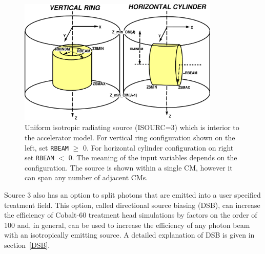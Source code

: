 \documentclass[12pt,twoside]{article}
\begin{document}
\begin{figure}[htbp]
\begin{center}
\leavevmode
\vspace{-0.8cm}
\mbox{}\hspace{0cm}
\includegraphics[height=6.0cm]{figures/src3}
\caption[ISOURC=3: Interior isotropic cylindrical source.]
{Uniform isotropic radiating source (ISOURC=3) which is interior to
the accelerator model.  For vertical ring
configuration shown on the left, set
{\tt RBEAM} $\geq$ 0.  For horizontal cylinder configuration on
right set {\tt RBEAM} $<$ 0.  The meaning of the
input variables depends on the configuration.  The
source is shown within a single CM, however it can span any number of
adjacent CMs.}
\label{fig_src3}
\end{center}
\end{figure}

Source 3 also has an option to split photons that are emitted into a user
specified treatment field. This option, called directional source biasing (DSB),
can increase the efficiency of Cobalt-60 treatment head simulations by factors
on the order of 100 and, in general, can be used to increase the efficiency of
any photon beam with an isotropically emitting source.  A detailed explanation
of DSB is given in section~\ref{DSB}.

\clearpage
\end{document}
